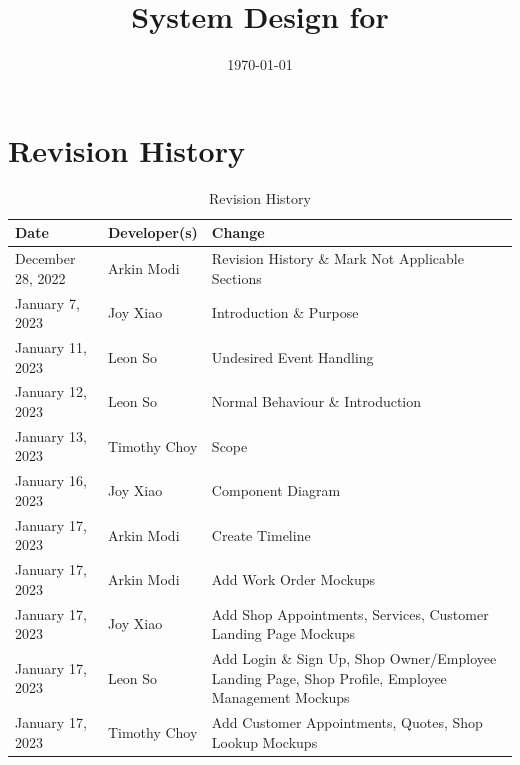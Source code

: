 \documentclass[12pt, titlepage]{article}
\begin{document}
\title{System Design for \progname{}}
\author{\authname}
\date{\today}

\maketitle


\section{Revision History}

\begin{table}[hp]
	\caption{Revision History} \label{TblRevisionHistory}
	\begin{tabularx}{\textwidth}{llX}
		\toprule
		\textbf{Date}     & \textbf{Developer(s)} & \textbf{Change}                                                                                   \\
		\midrule
		December 28, 2022 & Arkin Modi            & Revision History \& Mark Not Applicable Sections                                                  \\
		January 7, 2023   & Joy Xiao              & Introduction \& Purpose                                                                           \\
		January 11, 2023  & Leon So               & Undesired Event Handling                                                                          \\
		January 12, 2023  & Leon So               & Normal Behaviour \& Introduction                                                                  \\
		January 13, 2023  & Timothy Choy          & Scope                                                                                             \\
		January 16, 2023  & Joy Xiao              & Component Diagram                                                                                 \\
		January 17, 2023  & Arkin Modi            & Create Timeline                                                                                   \\
		January 17, 2023  & Arkin Modi            & Add Work Order Mockups                                                                            \\
		January 17, 2023  & Joy Xiao              & Add Shop Appointments, Services, Customer Landing Page Mockups                                    \\
		January 17, 2023  & Leon So               & Add Login \& Sign Up, Shop Owner/Employee Landing Page, Shop Profile, Employee Management Mockups \\
		January 17, 2023  & Timothy Choy          & Add Customer Appointments, Quotes, Shop Lookup Mockups                                            \\
		\bottomrule
	\end{tabularx}
\end{table}
\end{document}
